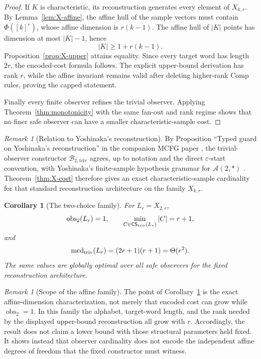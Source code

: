 \documentclass[11pt]{article}
\newtheorem{corollary}[theorem]{Corollary}
\theoremstyle{definition}
\theoremstyle{remark}
\newtheorem{remark}[theorem]{Remark}
\newcommand{\eps}{\varepsilon}
\newcommand{\obs}{\operatorname{obs}}
\newcommand{\mcd}{\operatorname{mcd}}
\newcommand{\CS}{\mathsf{CS}}
\begin{document}
\begin{proof}
If \(K\) is characteristic, its reconstruction generates every element of
\(X_{k,r}\).  By Lemma~\ref{lem:X-affine}, the affine hull of the sample
vectors must contain \(\Phi([k]^r)\), whose affine dimension is
\(r(k-1)\).  The affine hull of \(|K|\) points has dimension at most
\(|K|-1\), hence
\[
 |K|\ge1+r(k-1).
\]
Proposition~\ref{prop:X-upper} attains equality.  Since every target word has
length \(2r\), the encoded-cost formula follows.  The explicit upper-bound
derivation has rank \(r\), while the affine invariant remains valid after
deleting higher-rank Comp rules, proving the capped statement.

Finally every finite observer refines the trivial observer.  Applying
Theorem~\ref{thm:monotonicity} with the same fan-out and rank regime shows
that no finer safe observer can have a smaller characteristic-sample cost.
\end{proof}

\begin{remark}[Relation to Yoshinaka's reconstruction]
By Proposition ``Typed guard on Yoshinaka's reconstruction'' in the companion
MCFG paper \cite{KuriyamaMCFG}, the trivial-observer constructor
\(\mathcal B_{2,\mathrm{triv}}\) agrees, up to notation and the direct
\(\eps\)-start convention, with Yoshinaka's finite-sample hypothesis grammar
for \(\mathcal A(2,*)\) \cite{Yoshinaka2011}.  Theorem~\ref{thm:X-cost}
therefore gives an exact characteristic-sample cardinality for that standard
reconstruction architecture on the family \(X_{k,r}\).
\end{remark}

\begin{corollary}[The two-choice family]
\label{cor:X-twochoice}
For \(L_r=X_{2,r}\),
\[
 \obs_2(L_r)=1,\qquad
 \min_{C\in\CS_{\rm triv}(L_r)}|C|=r+1,
\]
and
\[
 \mcd_{\rm triv}(L_r)=(2r+1)(r+1)=\Theta(r^2).
\]
The same values are globally optimal over all safe observers for the fixed
reconstruction architecture.
\end{corollary}

\begin{remark}[Scope of the affine family]
The point of Corollary~\ref{cor:X-twochoice} is the exact affine-dimension
characterization, not merely that encoded cost can grow while
\(\obs_2=1\).  In this family the alphabet, target-word length, and the rank
needed by the displayed upper-bound reconstruction all grow with \(r\).
Accordingly, the result does not claim a lower bound with those structural
parameters held fixed.  It shows instead that observer cardinality does not
encode the independent affine degrees of freedom that the fixed constructor
must witness.
\end{remark}
\end{document}
